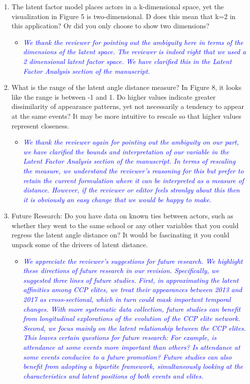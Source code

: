 \begin{enumerate}
	\item The latent factor model places actors in a k-dimensional space, yet the visualization in Figure 5 is two-dimensional. D does this mean that k=2 in this application? Or did you only choose to show two dimensions?
	\begin{itemize}
		\item \textcolor{blue}{ \emph{
			We thank the reviewer for pointing out the ambiguity here in terms of the dimensions of the latent space. The reviewer is indeed right that we used a 2 dimensional latent factor space. We have clarified this in the Latent Factor Analysis section of the manuscript.
		}}
	\end{itemize}
	\item What is the range of the latent angle distance measure? In Figure 8, it looks like the range is between -1 and 1. Do higher values indicate greater dissimilarity of appearance patterns, yet not necessarily a tendency to appear at the same events?  It may be more intuitive to rescale so that higher values represent closeness.
	\begin{itemize}
		\item \textcolor{blue}{ \emph{
			We thank the reviewer again for pointing out the ambiguity on our part, we have clarified the bounds and interpretation of our variable in the Latent Factor Analysis section of the manuscript. In terms of rescaling the measure, we understand the reviewer's reasoning for this but prefer to retain the current formulation where it can be interpreted as a measure of distance. However, if the reviewer or editor feels stronlgy about this then it is obviously an easy change that we would be happy to make. 
		}}
	\end{itemize}
	\item Future Research: Do you have data on known ties between actors, such as whether they went to the same school or any other variables that you could regress the latent angle distance on?  It would be fascinating it you could unpack some of the drivers of latent distance.
	\begin{itemize}
		\item \textcolor{blue}{ \emph{
			We appreciate the reviewer's suggestions for future research.  We highlight these directions of future research in our revision.  Specifically, we suggested three lines of future studies.  First, in approximating the latent affinities among CCP elites, we treat their appearances between 2013 and 2017 as cross-sectional, which in turn could mask important temporal changes.  With more systematic data collection, future studies can benefit from longitudinal explorations of the evolution of the CCP elite network.  Second, we focus mainly on the latent relationship between the CCP elites.  This leaves certain questions for future research:  For example, is attendance at some events more important than others?  Is attendance at some events conducive to a future promotion?  Future studies can also benefit from adopting a bipartite framework, simultaneously looking at the characteristics and latent positions of both events and elites.
		}}
	\end{itemize}
\end{enumerate}
